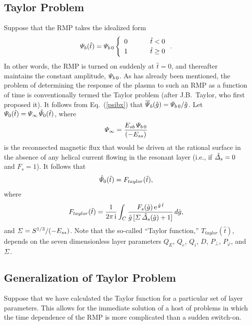 \documentclass[12pt,prb,aps]{revtex4-1}
\begin{document}
\subsection{Taylor Problem}
Suppose that the RMP takes the idealized form 
\begin{equation}
{\mit\Psi}_b(\hat{t}) = {\mit\Psi}_{b\,0}\left\{\begin{array}{ccc} 0&~~~~&\hat{t}<0\\[0.5ex]
1&&\hat{t}\geq 0\end{array}\right..
\end{equation}
In other words, the RMP is turned on suddenly at $\hat{t}=0$, and thereafter maintains the  constant amplitude,  ${\mit\Psi}_{b\,0}$. As has already been mentioned, the problem  of determining the
response of the plasma to such an RMP as a function of time is conventionally termed the
Taylor problem (after J.B.~Taylor, who first proposed it).\cite{hk}
 It follows from Eq.~(\ref{psibx}) that
$\overline{\mit\Psi}_b(\hat{g}) ={\mit\Psi}_{b\,0}/\hat{g}$.
Let
${\mit\Psi}_0(\hat{t}) = {\mit\Psi}_\infty\,\hat{\mit\Psi}_0(\hat{t})$,
where
\begin{equation}
{\mit\Psi}_\infty = \frac{E_{sb}\,{\mit\Psi}_{b\,0}}{(-E_{ss})}
\end{equation}
is the reconnected magnetic flux that would be driven at the rational surface in the absence of any helical current flowing in the resonant layer (i.e., if $\hat{\mit\Delta}_s=0$ and $F_s=1$). 
 It follows   that
\begin{equation}\label{e29}
\hat{\mit\Psi}_0(\hat{t}) =F_{taylor}(\hat{t}), 
\end{equation}
where
\begin{equation}\label{e30x}
F_{taylor}(\hat{t}) = \frac{1}{2\pi\,{\rm i}}\int_C \frac{F_s(\hat{g})\,{\rm e}^{\,\hat{g}\,\hat{t}}}{\hat{g}\,[{\mit\Sigma}\,\hat{\mit\Delta}_s(\hat{g})+1]}\,d\hat{g},
\end{equation}
and  ${\mit\Sigma}= S^{1/3}/(-E_{ss})$. 
Note that the so-called ``Taylor function,'' $T_{taylor}(\hat{t})$, depends on the seven dimensionless layer parameters $Q_E$, $Q_e$, $Q_i$, $D$, $P_\perp$, $P_\varphi$, and ${\mit\Sigma}$. 

\subsection{Generalization of Taylor Problem}
Suppose that we have calculated the Taylor function for a particular set of layer parameters. This allows for the
immediate solution of a host of problems in which the time dependence of the RMP is more complicated than a sudden switch-on.  
\end{document}
